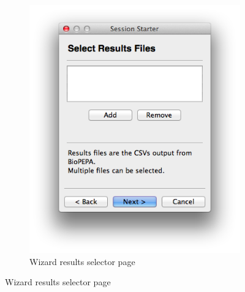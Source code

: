 \begin{figure}[h!]
\begin{subfigure}[b]{0.4\textwidth}
        \includegraphics[width=\textwidth]{images/wizard_page_2.png}
        \caption{Wizard results selector page}
        \label{fig:page_2}
    \end{subfigure}


\end{figure}
